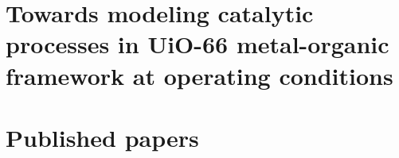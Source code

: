 \documentclass[10pt,twoside]{book}
\newcommand\oddpageleftmark{}
\newcommand\evenpagerightmark{}
\begin{document}
\renewcommand*{\thesection}{\thechapter.\arabic{section}}       %

\graphicspath{{figures/}}


\mainmatter     %
\renewcommand*{\thesection}{\thechapter.\arabic{section}}

\newcommand\fdtsvrightmarktmp{{\scshape\small Chapter }}
\renewcommand\evenpagerightmark{{\scshape\small\chaptername\ \thechapter}}
\renewcommand\oddpageleftmark{{\scshape\small\leftmark}}



\baselineskip 13.0pt

\part{Towards modeling catalytic processes in UiO-66 metal-organic framework at operating conditions}
\graphicspath{{figures/}}



%

\part{Published papers}
%


\appendix

%
%


% 
\clearpage{\pagestyle{empty}\cleardoublepage}




\cleardoublepage

\end{document}
